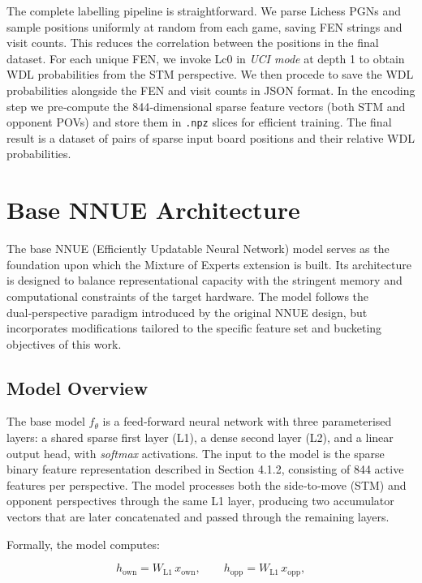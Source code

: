 The complete labelling pipeline is straightforward. We parse Lichess PGNs and sample positions uniformly at random from each game, saving FEN strings and visit counts. This reduces the correlation between the positions in the final dataset. For each unique FEN, we invoke Lc0 in \emph{UCI mode} at depth 1 to obtain WDL probabilities from the STM perspective. We then procede to save the WDL probabilities alongside the FEN and visit counts in JSON format. In the encoding step we pre‑compute the 844‑dimensional sparse feature vectors (both STM and opponent POVs) and store them in \texttt{.npz} slices for efficient training. The final result is a dataset of pairs of sparse input board positions and their relative WDL probabilities.



\section{Base NNUE Architecture}

The base NNUE (Efficiently Updatable Neural Network) model serves as the foundation upon which the Mixture of Experts extension is built. Its architecture is designed to balance representational capacity with the stringent memory and computational constraints of the target hardware. The model follows the dual‑perspective paradigm introduced by the original NNUE design, but incorporates modifications tailored to the specific feature set and bucketing objectives of this work.

\subsection{Model Overview}

The base model $f_\theta$ is a feed‑forward neural network with three parameterised layers: a shared sparse first layer (L1), a dense second layer (L2), and a linear output head, with \emph{softmax} activations. The input to the model is the sparse binary feature representation described in Section 4.1.2, consisting of 844 active features per perspective. The model processes both the side‑to‑move (STM) and opponent perspectives through the same L1 layer, producing two accumulator vectors that are later concatenated and passed through the remaining layers.

Formally, the model computes:

\[
h_{\text{own}} = W_{\text{L1}} \, x_{\text{own}}, \qquad
h_{\text{opp}} = W_{\text{L1}} \, x_{\text{opp}},
\]

